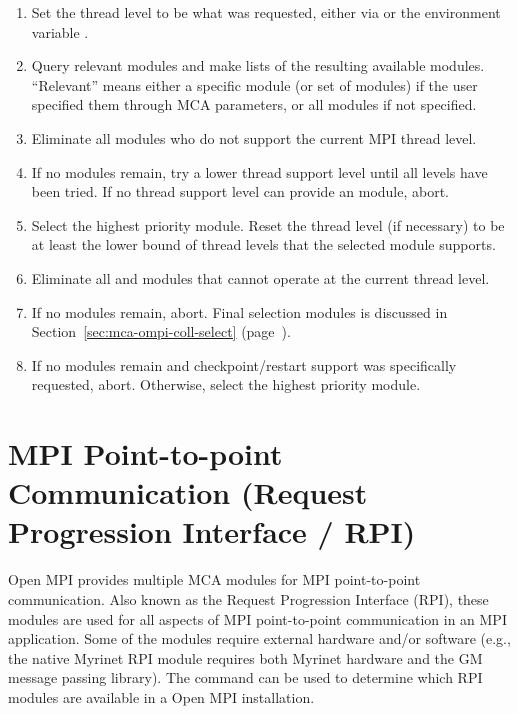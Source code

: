 \begin{enumerate}
\item Set the thread level to be what was requested, either via
   or the environment variable
  .

\item Query relevant modules and make lists of the resulting available
  modules.  ``Relevant'' means either a specific module (or set of
  modules) if the user specified them through MCA parameters, or all
  modules if not specified.
  
\item Eliminate all modules who do not support the current MPI thread
  level.

\item If no  modules remain, try a lower thread support
  level until all levels have been tried.  If no thread support level
  can provide an  module, abort.
  
\item Select the highest priority  module.  Reset the thread
  level (if necessary) to be at least the lower bound of thread levels
  that the selected  module supports.
  
\item Eliminate all  and  modules that cannot
  operate at the current thread level.
  
\item If no  modules remain, abort.  Final selection
   modules is discussed in
  Section~\ref{sec:mca-ompi-coll-select}
  (page~\pageref{sec:mca-ompi-coll-select}).

\item If no  modules remain and checkpoint/restart support
  was specifically requested, abort.  Otherwise, select the highest
  priority  module.
\end{enumerate}


\section{MPI Point-to-point Communication (Request Progression
  Interface / RPI)}
\label{sec:mca-ompi-rpi}

Open MPI provides multiple MCA modules for MPI point-to-point
communication.  Also known as the Request Progression Interface (RPI),
these modules are used for all aspects of MPI point-to-point
communication in an MPI application.  Some of the modules require
external hardware and/or software (e.g., the native Myrinet RPI module
requires both Myrinet hardware and the GM message passing library).
The  command can be used to determine which RPI modules
are available in a Open MPI installation.

